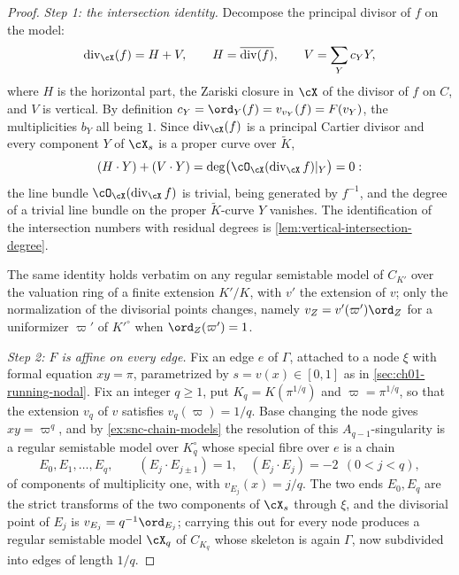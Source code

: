 \begin{proof}
\emph{Step 1: the intersection identity.}  Decompose the principal divisor of
$f$ on the model:
\[
 \operatorname{div}_{\cX}(f)=H+V,
 \qquad
 H=\overline{\operatorname{div}(f)},
 \qquad
 V=\sum_Yc_YY ,
\]
where $H$ is the horizontal part, the Zariski closure in $\cX$ of the divisor
of $f$ on $C$, and $V$ is vertical.  By definition
$c_Y=\ord_Y(f)=v_{v_Y}(f)=F(v_Y)$, the multiplicities $b_Y$ all being $1$.
Since $\operatorname{div}_\cX(f)$ is a principal Cartier divisor and every
component $Y$ of $\cX_s$ is a proper curve over $\widetilde K$,
\begin{equation}
\label{eq:ch08-principal-degree-zero}
 (H\cdot Y)+(V\cdot Y)=\deg\bigl(\cO_\cX(\operatorname{div}_\cX f)|_Y\bigr)=0 :
\end{equation}
the line bundle $\cO_\cX(\operatorname{div}_\cX f)$ is trivial, being
generated by $f^{-1}$, and the degree of a trivial line bundle on the proper
$\widetilde K$-curve $Y$ vanishes.  The identification of the intersection
numbers with residual degrees is
\cref{lem:vertical-intersection-degree}.

The same identity holds verbatim on any regular semistable model of $C_{K'}$
over the valuation ring of a finite extension $K'/K$, with $v'$ the extension
of $v$; only the normalization of the divisorial points changes, namely
$v_Z=v'(\varpi')\ord_Z$ for a uniformizer $\varpi'$ of $K'^\circ$ when
$\ord_Z(\varpi')=1$.

\emph{Step 2: $F$ is affine on every edge.}  Fix an edge $e$ of $\Gamma$,
attached to a node $\xi$ with formal equation $xy=\pi$, parametrized by
$s=v(x)\in[0,1]$ as in \cref{sec:ch01-running-nodal}.  Fix an integer
$q\geq1$, put $K_q=K(\pi^{1/q})$ and $\varpi=\pi^{1/q}$, so that the
extension $v_q$ of $v$ satisfies $v_q(\varpi)=1/q$.  Base changing the node
gives $xy=\varpi^q$, and by \cref{ex:snc-chain-models} the resolution of this
$A_{q-1}$-singularity is a regular semistable model over $K_q^\circ$ whose
special fibre over $e$ is a chain
\[
 E_0,E_1,\ldots,E_q ,
 \qquad
 (E_j\cdot E_{j\pm1})=1,\quad (E_j\cdot E_j)=-2\ \ (0<j<q),
\]
of components of multiplicity one, with $v_{E_j}(x)=j/q$.  The two ends
$E_0,E_q$ are the strict transforms of the two components of $\cX_s$ through
$\xi$, and the divisorial point of $E_j$ is $v_{E_j}=q^{-1}\ord_{E_j}$;
carrying this out for every node produces a regular semistable model $\cX_q$
of $C_{K_q}$ whose skeleton is again $\Gamma$, now subdivided into edges of
length $1/q$.


\end{proof}
